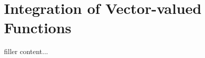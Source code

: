 \section{Integration of Vector-valued Functions}\label{sec:integration-of-vector-valued-functions}

filler content...

